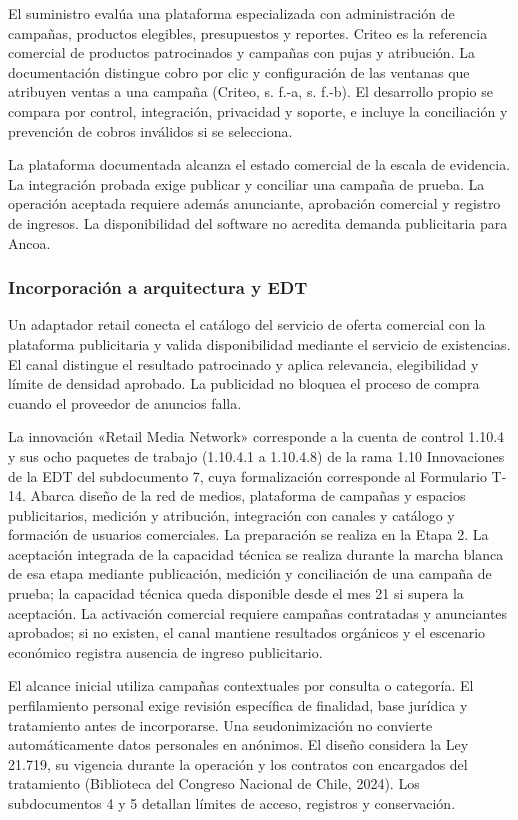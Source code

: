 \documentclass[11pt]{article}
\begin{document}
El suministro evalúa una plataforma especializada con administración de campañas, productos elegibles, presupuestos y reportes. Criteo es la referencia comercial de productos patrocinados y campañas con pujas y atribución. La documentación distingue cobro por clic y configuración de las ventanas que atribuyen ventas a una campaña (Criteo, s. f.-a, s. f.-b). El desarrollo propio se compara por control, integración, privacidad y soporte, e incluye la conciliación y prevención de cobros inválidos si se selecciona.

La plataforma documentada alcanza el estado comercial de la escala de evidencia. La integración probada exige publicar y conciliar una campaña de prueba. La operación aceptada requiere además anunciante, aprobación comercial y registro de ingresos. La disponibilidad del software no acredita demanda publicitaria para Ancoa.

\subsubsection{Incorporación a arquitectura y EDT}\label{incorporaciuxf3n-a-arquitectura-y-edt-3}

Un adaptador retail conecta el catálogo del servicio de oferta comercial con la plataforma publicitaria y valida disponibilidad mediante el servicio de existencias. El canal distingue el resultado patrocinado y aplica relevancia, elegibilidad y límite de densidad aprobado. La publicidad no bloquea el proceso de compra cuando el proveedor de anuncios falla.

La innovación «Retail Media Network» corresponde a la cuenta de control 1.10.4 y sus ocho paquetes de trabajo (1.10.4.1 a 1.10.4.8) de la rama 1.10 Innovaciones de la EDT del subdocumento 7, cuya formalización corresponde al Formulario T-14. Abarca diseño de la red de medios, plataforma de campañas y espacios publicitarios, medición y atribución, integración con canales y catálogo y formación de usuarios comerciales. La preparación se realiza en la Etapa 2. La aceptación integrada de la capacidad técnica se realiza durante la marcha blanca de esa etapa mediante publicación, medición y conciliación de una campaña de prueba; la capacidad técnica queda disponible desde el mes 21 si supera la aceptación. La activación comercial requiere campañas contratadas y anunciantes aprobados; si no existen, el canal mantiene resultados orgánicos y el escenario económico registra ausencia de ingreso publicitario.

El alcance inicial utiliza campañas contextuales por consulta o categoría. El perfilamiento personal exige revisión específica de finalidad, base jurídica y tratamiento antes de incorporarse. Una seudonimización no convierte automáticamente datos personales en anónimos. El diseño considera la Ley 21.719, su vigencia durante la operación y los contratos con encargados del tratamiento (Biblioteca del Congreso Nacional de Chile, 2024). Los subdocumentos 4 y 5 detallan límites de acceso, registros y conservación.
\end{document}
